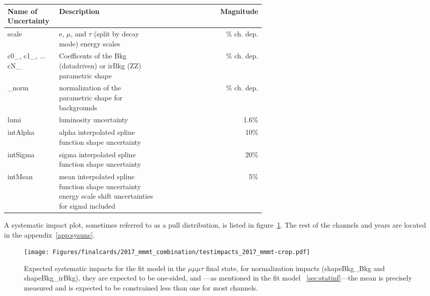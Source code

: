 \begin{table}[h!tb]
\centering
{}
\begin{tabular}{|p{0.2\linewidth}|p{0.4\linewidth}|r|}
\hline  
Name of Uncertainty & Description & Magnitude\\\hline
scale &  e, $\mu$, and $\tau$ (split by decay mode) energy scales & \% ch. dep. \\\hline
 c0\_, c1\_, ... cN\_& Coefficents of the Bkg (datadriven) or irBkg (ZZ) parametric shape & \% ch. dep. \\\hline
\_norm & normalization of the parametric shape for backgrounds & \% ch. dep. \\\hline
lumi & luminosity uncertainty & 1.6\%  \\\hline
intAlpha & alpha interpolated spline function shape uncertainty & 10\% \\\hline
intSigma & sigma interpolated spline function shape uncertainty & 20\% \\\hline
intMean & mean interpolated spline function shape uncertainty energy scale shift uncertainties for signal included & 5\% \\\hline
\end{tabular}
\end{table}
\clearpage 

A systematic impact plot, sometimes referred to as a pull distribution, is listed in figure~\ref{fig:impacts_2017_mmmt}. The rest of the channels and years are located in the appendix~\ref{app:sysunc}.

\begin{figure}[ht!b]
    \centering 
\texttt{[image: Figures/finalcards/2017\_mmmt\_combination/testimpacts\_2017\_mmmt-crop.pdf]}
    \caption{\label{fig:impacts_2017_mmmt} Expected systematic impacts for the fit model in the $\mu\mu\mu\tau$ final state, for normalization impacts (shapeBkg\_Bkg and shapeBkg\_irBkg), they are expected to be one-sided, and ---as mentioned in the fit model ~\ref{sec:statinf}---the mean is precisely measured and is expected to be constrained less than one for most channels.}
\end{figure}




